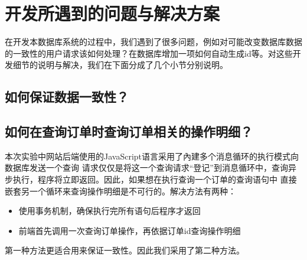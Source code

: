 \documentclass{myreport}
\begin{document}


\chapter{开发所遇到的问题与解决方案}


在开发本数据库系统的过程中，我们遇到了很多问题，例如对可能改变数据库数据的一致性的用户请求该如何处理？在数据库增加一项如何自动生成id等。对这些开发细节的说明与解决，我们在下面分成了几个小节分别说明。

\section{如何保证数据一致性？}

\section{如何在查询订单时查询订单相关的操作明细？}
本次实验中网站后端使用的JavaScript语言采用了內建多个消息循环的执行模式向数据库发送一个查询
请求仅仅是将这一个查询请求“登记”到消息循环中，查询异步执行，程序将立即返回。因此，如果想在执行查询一个订单的查询语句中
直接嵌套另一个循环来查询操作明细是不可行的。解决方法有两种：
\begin{itemize}
    \item 使用事务机制，确保执行完所有语句后程序才返回
    \item 前端首先调用一次查询订单操作，再依据订单id查询操作明细
\end{itemize}
第一种方法更适合用来保证一致性。因此我们采用了第二种方法。


% 
% 

\appendix


\cleardoublepage
\end{document}
